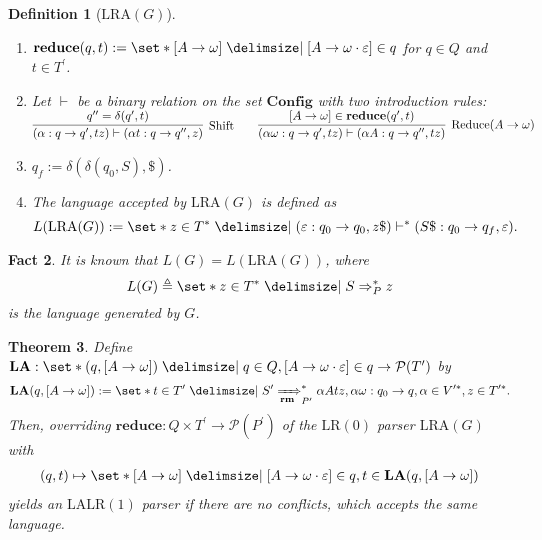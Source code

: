 \documentclass[12pt]{article}
\newtheorem{theorem}{Theorem}
\newtheorem{definition}[theorem]{Definition}
\newtheorem{fact}[theorem]{Fact}
\newcommand{\powerset}{ \ensuremath{\mathcal{P}} }
\begin{document}
\begin{definition}[$\mathrm{LRA}(G)$]
\begin{enumerate}
\item[$\mathrm{(xii)}$] $\mathbf{reduce} ( q , t ) := \set*{ [ A \to \omega ] \mid [ A \to \omega \cdot \varepsilon ] \in q }$ for $q \in Q$ and $t \in T^\prime$.
\item[$\mathrm{(vii)}$] Let $\vdash$ be a binary relation on the set $\mathbf{Config}$ with two introduction rules: \newline $\begin{matrix} \infer[\mathrm{Shift}]{ ( \alpha : q \to q^\prime , t z ) \vdash ( \alpha t : q \to q^{\prime \prime} , z ) }{ q^{\prime \prime} = \delta ( q^\prime , t ) } & & \infer[\mathrm{Reduce} ( A \to \omega )]{ ( \alpha \omega : q \to q^\prime , t z ) \vdash ( \alpha A : q \to q^{\prime \prime} , t z ) }{ [ A \to \omega ] \in \mathbf{reduce} ( q^\prime , t ) } \end{matrix}$
\item[$\mathrm{(xiv)}$] $q_f := \delta ( \delta ( q_0 , S ) , \$ )$.
\item[$\mathrm{(xv)}$] The language accepted by $\mathrm{LRA}(G)$ is defined as \[L ( \mathrm{LRA} ( G ) ) := \set*{ z \in { T }^\ast \mid ( \varepsilon : q_0 \to q_0 , z \$ ) \vdash^\ast ( S \$ : q_0 \to q_f , \varepsilon ) } .\]
\end{enumerate}
\end{definition}

\begin{fact}
It is known that $L ( G ) = L ( \mathrm{LRA} ( G ) )$, where \[L(G) \triangleq \set*{ z \in { T }^\ast \mid S \Rightarrow_{P}^\ast z }\] is the language generated by $G$.
\end{fact}

\begin{theorem}
Define $\mathbf{LA} : \set*{ ( q , [ A \to \omega ] ) \mid q \in Q , [ A \to \omega \cdot \varepsilon ] \in q } \to \powerset ( T^\prime )$ by
\begin{align}
\mathbf{LA} ( q , [ A \to \omega ] ) := \set*{ t \in T^\prime \mid S^\prime \xRightarrow[\mathbf{rm}]{}_{P^\prime}^\ast \alpha A t z , \alpha \omega : q_0 \to q , \alpha \in V^{\prime \ast}, z \in T^{\prime \ast} } .
\end{align}
Then, overriding $\mathbf{reduce} : Q \times T^\prime \to \powerset ( P^\prime )$ of the $\mathrm{LR(0)}$ parser $\mathrm{LRA} ( G )$ with
\begin{align*}
( q , t ) \mapsto \set*{ [ A \to \omega ] \mid [ A \to \omega \cdot \varepsilon ] \in q , t \in \mathbf{LA} ( q , [ A \to \omega ] ) }
\end{align*}
yields an $\mathrm{LALR(1)}$ parser if there are no conflicts, which accepts the same language.
\end{theorem}
\end{document}

